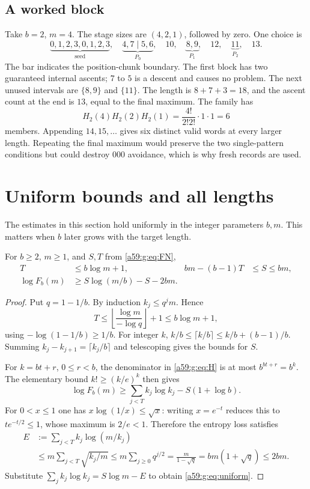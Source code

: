 \documentclass[11pt,letterpaper]{article}
\theoremstyle{remark}\newtheorem{remark}[theorem]{Remark}
\theoremstyle{remark}\newtheorem{wremark}{Remark}\renewcommand{\thewremark}{W\arabic{wremark}}
\theoremstyle{plain}\newtheorem{wcorollary}[wremark]{Corollary}
\begin{document}
\subsection{A worked block}
Take $b=2$, $m=4$. The stage sizes are $(4,2,1)$, followed by zero. One choice is
\begin{equation}\label{a59:g:eq:example}
 \underbrace{0,1,2,3,0,1,2,3}_{\text{seed}},\quad
 \underbrace{4,7\mid5,6}_{P_0},\quad10,\quad
 \underbrace{8,9}_{P_1},\quad12,\quad
 \underbrace{11}_{P_2},\quad13.
\end{equation}
The bar indicates the position-chunk boundary. The first block has two guaranteed internal ascents; $7$ to $5$ is a descent and causes no problem. The next unused intervals are $\{8,9\}$ and $\{11\}$. The length is $8+7+3=18$, and the ascent count at the end is $13$, equal to the final maximum. The family has
\[
 H_2(4)H_2(2)H_2(1)=\frac{4!}{2!2!}\cdot1\cdot1=6
\]
members. Appending $14,15,\ldots$ gives six distinct valid words at every larger length. Repeating the final maximum would preserve the two single-pattern conditions but could destroy $000$ avoidance, which is why fresh records are used.
\section{Uniform bounds and all lengths}\label{a59:g:sec:bounds}
The estimates in this section hold uniformly in the integer parameters $b,m$. This matters when $b$ later grows with the target length.

\begin{lemma}\label{a59:g:lem:uniform}
For $b\geq2$, $m\geq1$, and $S,T$ from \eqref{a59:g:eq:FN},
\begin{align}
 T&\leq b\log m+1, & bm-(b-1)T&\leq S\leq bm,\label{a59:g:eq:ST}\\
 \log F_b(m)&\geq S\log(m/b)-S-2bm.\label{a59:g:eq:uniform}
\end{align}
\end{lemma}
\begin{proof}
Put $q=1-1/b$. By induction $k_j\leq q^jm$. Hence
\[
 T\leq\left\lfloor\frac{\log m}{-\log q}\right\rfloor+1
   \leq b\log m+1,
\]
using $-\log(1-1/b)\geq1/b$. For integer $k$,
$k/b\leq\lceil k/b\rceil\leq k/b+(b-1)/b$.
Summing $k_j-k_{j+1}=\lceil k_j/b\rceil$ and telescoping gives the bounds for $S$.

For $k=bt+r$, $0\leq r<b$, the denominator in \eqref{a59:g:eq:H} is at most $b^{bt+r}=b^k$. The elementary bound $k!\geq(k/e)^k$ then gives
\[
 \log F_b(m)\geq\sum_{j<T}k_j\log k_j-S(1+\log b).
\]
For $0<x\leq1$ one has $x\log(1/x)\leq\sqrt x$: writing $x=e^{-t}$ reduces this to $te^{-t/2}\leq1$, whose maximum is $2/e<1$. Therefore the entropy loss satisfies
\begin{align*}
 E&:=\sum_{j<T} k_j\log(m/k_j)\\
  &\leq m\sum_{j<T}\sqrt{k_j/m}
   \leq m\sum_{j\geq0}q^{j/2}
   =\frac{m}{1-\sqrt q}=bm(1+\sqrt q)\leq2bm.
\end{align*}
Substitute $\sum_j k_j\log k_j=S\log m-E$ to obtain \eqref{a59:g:eq:uniform}.
\end{proof}
\end{document}
